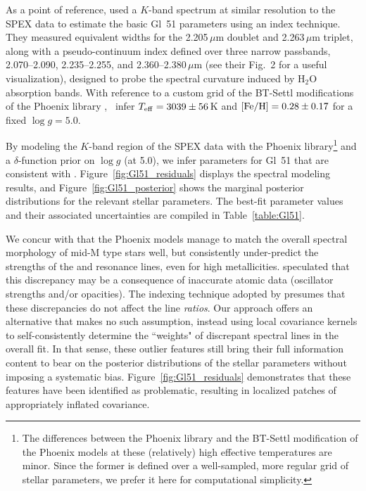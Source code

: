 \documentclass[iop,floatfix,twocolappendix]{emulateapj}
\begin{document}
As a point of reference, \citet{rojas-ayala12} used a $K$-band spectrum at similar resolution to 
the SPEX data to estimate the basic Gl~51 parameters using an index technique.  They measured 
equivalent widths for the 2.205\,$\mu$m  doublet and 2.263\,$\mu$m  triplet, 
along with a pseudo-continuum index defined over three narrow passbands, 2.070--2.090, 
2.235--2.255, and 2.360--2.380\,$\mu$m (see their Fig.~2 for a useful visualization), designed to 
probe the spectral curvature induced by H$_2$O absorption bands.  With reference to a custom grid 
of the {\sc BT-Settl} modifications of the {\sc Phoenix} library \citep{allard12}, 
\citeauthor{rojas-ayala12}~infer $T_{\rm eff} = 3039\pm56$\,K and $[{\rm Fe/H}] = 0.28\pm0.17$ for 
a fixed $\log g = 5.0$.  

By modeling the $K$-band region of the SPEX data with the {\sc Phoenix} library\footnote{The 
differences between the \citet{husser13} {\sc Phoenix} library and the {\sc BT-Settl} modification 
of the {\sc Phoenix} models at these (relatively) high effective temperatures are minor.  Since the 
former is defined over a well-sampled, more regular grid of stellar parameters, we prefer it here 
for computational simplicity.} and a $\delta$-function prior on $\log g$ (at 5.0), we infer 
parameters for Gl~51 that are consistent with \citet{rojas-ayala12}.  
Figure~\ref{fig:Gl51_residuals} displays the spectral modeling results, and 
Figure~\ref{fig:Gl51_posterior} shows the marginal posterior distributions for the relevant stellar 
parameters.  The best-fit parameter values and their associated uncertainties are compiled in 
Table~\ref{table:Gl51}.

We concur with \citet{rojas-ayala12} that the {\sc Phoenix} models manage to match the overall 
spectral morphology of mid-M type stars well, but consistently under-predict the strengths of the 
 and  resonance lines, even for high metallicities.  \citet{rajpurohit10} 
speculated that this discrepancy may be a consequence of inaccurate atomic data (oscillator 
strengths and/or opacities).  The indexing technique adopted by \citeauthor{rojas-ayala12} presumes 
that these discrepancies do not affect the line {\it ratios}.  Our approach offers an alternative 
that makes no such assumption, instead using local covariance kernels to self-consistently 
determine the ``weights" of discrepant spectral lines in the overall fit.  In that sense, these 
outlier features still bring their full information content to bear on the posterior distributions 
of the stellar parameters without imposing a systematic bias.  Figure~\ref{fig:Gl51_residuals} 
demonstrates that these features have been identified as problematic, resulting in localized 
patches of appropriately inflated covariance.
\end{document}
